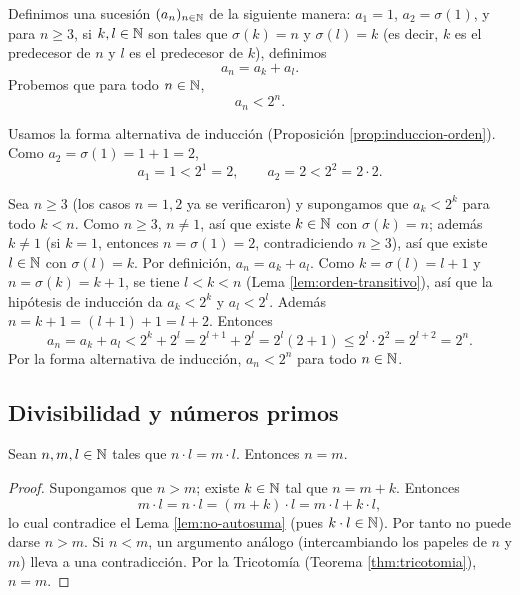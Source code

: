 \documentclass[12pt,a4paper]{book}
\begin{document}
    \begin{ejemplo}
        Definimos una sucesión $(a_n)_{n\in\mathbb{N}}$ de la siguiente manera: $a_1=1$, $a_2=\sigma(1)$, y para $n\ge3$, si $k,l\in\mathbb{N}$ son tales que $\sigma(k)=n$ y $\sigma(l)=k$ (es decir, $k$ es el predecesor de $n$ y $l$ es el predecesor de $k$), definimos
        \begin{equation*}
            a_n = a_k+a_l.
        \end{equation*}
        Probemos que para todo $n\in\mathbb{N}$,
        \begin{equation*}
            a_n < 2^n.
        \end{equation*}

        Usamos la forma alternativa de inducción (Proposición \ref{prop:induccion-orden}). Como $a_2=\sigma(1)=1+1=2$,
        \begin{equation*}
            a_1=1<2^1=2, \qquad a_2=2<2^2=2\cdot2.
        \end{equation*}

        Sea $n\ge3$ (los casos $n=1,2$ ya se verificaron) y supongamos que $a_k<2^k$ para todo $k<n$. Como $n\ge3$, $n\neq1$, así que existe $k\in\mathbb{N}$ con $\sigma(k)=n$; además $k\neq1$ (si $k=1$, entonces $n=\sigma(1)=2$, contradiciendo $n\ge3$), así que existe $l\in\mathbb{N}$ con $\sigma(l)=k$. Por definición, $a_n=a_k+a_l$. Como $k=\sigma(l)=l+1$ y $n=\sigma(k)=k+1$, se tiene $l<k<n$ (Lema \ref{lem:orden-transitivo}), así que la hipótesis de inducción da $a_k<2^k$ y $a_l<2^l$. Además $n=k+1=(l+1)+1=l+2$. Entonces
        \begin{equation*}
            a_n = a_k+a_l < 2^k+2^l = 2^{l+1}+2^l = 2^l(2+1) \le 2^l\cdot2^2 = 2^{l+2} = 2^n.
        \end{equation*}
        Por la forma alternativa de inducción, $a_n<2^n$ para todo $n\in\mathbb{N}$.
    \end{ejemplo}

    \subsection{Divisibilidad y números primos}

    \begin{proposicion}
        \label{prop:cancelacion-producto}
        Sean $n,m,l\in\mathbb{N}$ tales que $n\cdot l=m\cdot l$. Entonces $n=m$.
    \end{proposicion}
    \begin{proof}
        Supongamos que $n>m$; existe $k\in\mathbb{N}$ tal que $n=m+k$. Entonces
        \begin{equation*}
            m\cdot l = n\cdot l = (m+k)\cdot l = m\cdot l+k\cdot l,
        \end{equation*}
        lo cual contradice el Lema \ref{lem:no-autosuma} (pues $k\cdot l\in\mathbb{N}$). Por tanto no puede darse $n>m$. Si $n<m$, un argumento análogo (intercambiando los papeles de $n$ y $m$) lleva a una contradicción. Por la Tricotomía (Teorema \ref{thm:tricotomia}), $n=m$.
    \end{proof}
\end{document}
